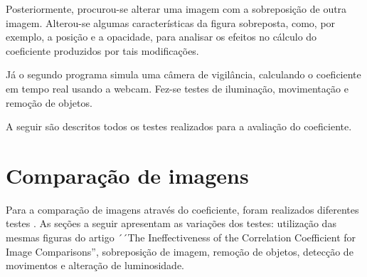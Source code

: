 \documentclass[10pt,a4paper]{article}
\begin{document}
Posteriormente, procurou-se alterar uma imagem com a
sobreposição de outra imagem. Alterou-se algumas características da
figura sobreposta, como, por exemplo, a posição e a opacidade, para
analisar os efeitos no cálculo do coeficiente produzidos por tais modificações. 

Já o segundo programa simula uma câmera de vigilância, calculando o
coeficiente em tempo real usando a webcam. Fez-se testes de
iluminação, movimentação e remoção de objetos.

A seguir são descritos todos os testes realizados para a avaliação do coeficiente.

\newpage
\section{Comparação de imagens}

Para a comparação de imagens através do coeficiente, foram realizados diferentes testes
. As seções a seguir apresentam as variações dos testes: utilização
das mesmas figuras do artigo ´´The Ineffectiveness of the Correlation
Coefficient for Image Comparisons'', sobreposição de imagem, remoção de objetos, detecção
de movimentos e alteração de luminosidade.  
\end{document}
